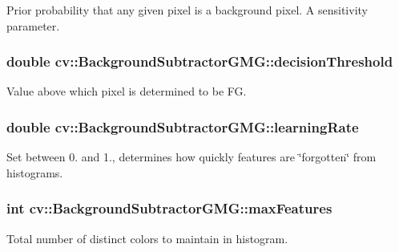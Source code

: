 Prior probability that any given pixel is a background pixel. A sensitivity parameter. 

\hypertarget{classcv_1_1BackgroundSubtractorGMG_af160ea140a4bc9a24e784f94d06aebef}{
\subsubsection[{decision\-Threshold}]{\setlength{\rightskip}{0pt plus 5cm}double cv\-::\-Background\-Subtractor\-G\-M\-G\-::decision\-Threshold}}\label{classcv_1_1BackgroundSubtractorGMG_af160ea140a4bc9a24e784f94d06aebef}


Value above which pixel is determined to be F\-G. 

\hypertarget{classcv_1_1BackgroundSubtractorGMG_ab573842c1b123e8ad99fe84a03f877b7}{
\subsubsection[{learning\-Rate}]{\setlength{\rightskip}{0pt plus 5cm}double cv\-::\-Background\-Subtractor\-G\-M\-G\-::learning\-Rate}}\label{classcv_1_1BackgroundSubtractorGMG_ab573842c1b123e8ad99fe84a03f877b7}


Set between 0. and 1., determines how quickly features are \char`\"{}forgotten\char`\"{} from histograms. 

\hypertarget{classcv_1_1BackgroundSubtractorGMG_a76c047648867024272c6c63d9b47679b}{
\subsubsection[{max\-Features}]{\setlength{\rightskip}{0pt plus 5cm}int cv\-::\-Background\-Subtractor\-G\-M\-G\-::max\-Features}}\label{classcv_1_1BackgroundSubtractorGMG_a76c047648867024272c6c63d9b47679b}


Total number of distinct colors to maintain in histogram. 

